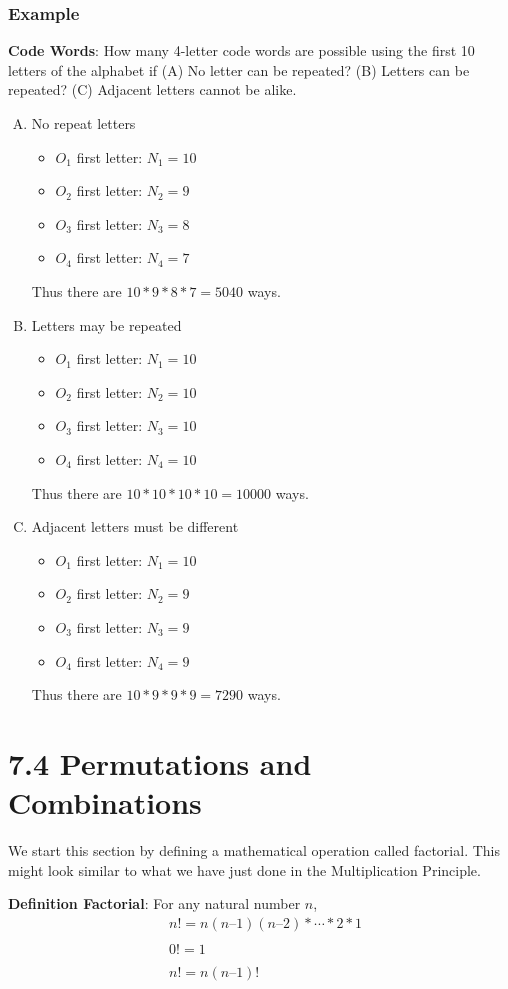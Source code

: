 \documentclass[14pt]{extarticle}
\begin{document}
\subsubsection{Example}
\textbf{Code Words}: How many 4-letter code words are possible using the first 10 letters of the alphabet if (A) No letter can be repeated? (B) Letters can be repeated? (C) Adjacent letters cannot be alike.
\begin{enumerate}[A)]
	\item No repeat letters
	\begin{itemize}
		\item $O_1$ first letter: $N_1 = 10$
		\item $O_2$ first letter: $N_2 = 9$
		\item $O_3$ first letter: $N_3 = 8$
		\item $O_4$ first letter: $N_4 = 7$
	\end{itemize}
	Thus there are $10*9*8*7 = 5040$ ways.
	\item Letters may be repeated
	\begin{itemize}
		\item $O_1$ first letter: $N_1 = 10$
		\item $O_2$ first letter: $N_2 = 10$
		\item $O_3$ first letter: $N_3 = 10$
		\item $O_4$ first letter: $N_4 = 10$
	\end{itemize}
	Thus there are $10*10*10*10 = 10000$ ways.
	\item Adjacent letters must be different
	\begin{itemize}
		\item $O_1$ first letter: $N_1 = 10$
		\item $O_2$ first letter: $N_2 = 9$
		\item $O_3$ first letter: $N_3 = 9$
		\item $O_4$ first letter: $N_4 = 9$
	\end{itemize}
	Thus there are $10*9*9*9 = 7290$ ways.
\end{enumerate}

\section*{7.4 Permutations and Combinations}
We start this section by defining a mathematical operation called factorial. This might look similar to what we have just done in the Multiplication Principle.
\begin{tcolorbox}[enhanced jigsaw,colback=bg,boxrule=0pt,arc=0pt] 
	\textbf{Definition Factorial}:
	For any natural number $n$, 
	\begin{align*}
		&n! = n(n – 1)(n – 2)*\cdots*2*1   \\
		\\
		&0! = 1 \\
		\\
		&n! = n(n – 1)!
	\end{align*}
\end{tcolorbox}
\end{document}
